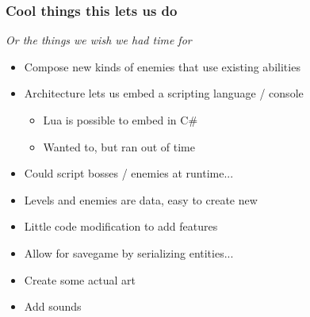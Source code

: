 \documentclass[screen]{beamer}
\begin{document}
\begin{frame}
  \frametitle{Cool things this lets us do}
  \emph{Or the things we wish we had time for}
  \begin{itemize}
    \item Compose new kinds of enemies that use existing abilities
    \item Architecture lets us embed a scripting language / console
      \begin{itemize}
        \item Lua is possible to embed in C\#
        \item Wanted to, but ran out of time
      \end{itemize}
    \item Could script bosses / enemies at runtime...
    \item Levels and enemies are data, easy to create new
    \item Little code modification to add features
    \item Allow for savegame by serializing entities...
    \item Create some actual art
    \item Add sounds
  \end{itemize}
\end{frame}
\end{document}
